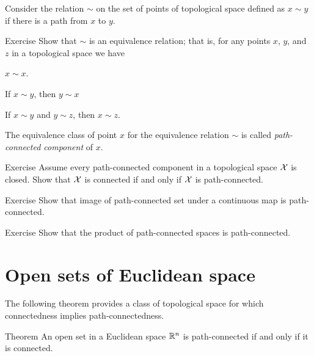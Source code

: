 Consider the relation $\sim$ on the set of points of topological space defined as $x\sim y$ if there is a path from $x$ to $y$.

\begin{thm}{Exercise}
Show that $\sim$ is an equivalence relation;
that is, for any points $x$, $y$, and $z$ in a topological space we have

\begin{subthm}{}
$x\sim x$.
\end{subthm}

\begin{subthm}{}
If $x\sim y$, then $y\sim x$
\end{subthm}

\begin{subthm}{}
If $x\sim y$ and $y\sim z$, then $x\sim z$.
\end{subthm}

\end{thm}

The equivalence class of point $x$ for the equivalence relation $\sim$ is called \emph{path-connected component} of $x$. 

\begin{thm}{Exercise}
Assume every path-connected component in a topological space $\mathcal{X}$ is closed.
Show that $\mathcal{X}$ is connected if and only if $\mathcal{X}$ is path-connected.
\end{thm}

\begin{thm}{Exercise}
Show that image of path-connected set under a continuous map is path-connected.
\end{thm}

\begin{thm}{Exercise}
Show that the product of path-connected spaces is path-connected.
\end{thm}

\section{Open sets of Euclidean space}

The following theorem provides a class of topological space for which connectedness implies path-connectedness.

\begin{thm}{Theorem}\label{thm:open-connected=path-connected}
An open set in a Euclidean space $\mathbb{R}^n$ is path-connected if and only if it is connected.
\end{thm}

